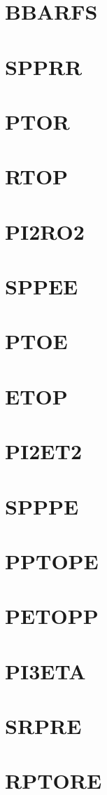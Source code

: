\documentclass[10pt,UTF8]{ctexbook}
\begin{document}
\section{BBARFS}
\section{SPPRR}
\section{PTOR}
\section{RTOP}
\section{PI2RO2}
\section{SPPEE}
\section{PTOE}
\section{ETOP}
\section{PI2ET2}
\section{SPPPE}
\section{PPTOPE}
\section{PETOPP}
\section{PI3ETA}
\section{SRPRE}
\section{RPTORE}
\end{document}
